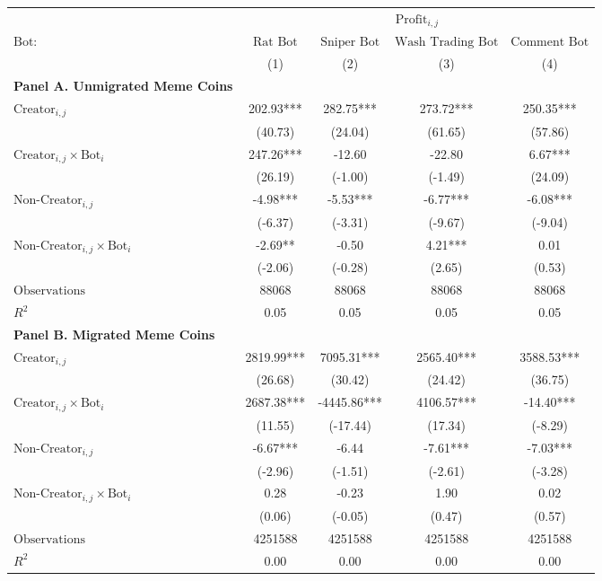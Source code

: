 \begin{tabular}{lcccc}
\toprule
 & \multicolumn{4}{c}{$\text{Profit}_{i,j}$} \\
\cline{2-5}
 $\text{Bot}:$ & $\text{Rat Bot}$ & $\text{Sniper Bot}$ & $\text{Wash Trading Bot}$ & $\text{Comment Bot}$ \\
 & (1) & (2) & (3) & (4)\\
\midrule
\textbf{Panel A. Unmigrated Meme Coins}\\
\midrule
$\text{Creator}_{i,j}$ & 202.93*** & 282.75*** & 273.72*** & 250.35*** \\
 & (40.73) & (24.04) & (61.65) & (57.86) \\
$\text{Creator}_{i,j} \times \text{Bot}_i$ & 247.26*** & -12.60 & -22.80 & 6.67*** \\
 & (26.19) & (-1.00) & (-1.49) & (24.09) \\
$\text{Non-Creator}_{i,j}$ & -4.98*** & -5.53*** & -6.77*** & -6.08*** \\
 & (-6.37) & (-3.31) & (-9.67) & (-9.04) \\
$\text{Non-Creator}_{i,j} \times \text{Bot}_i$ & -2.69** & -0.50 & 4.21*** & 0.01 \\
 & (-2.06) & (-0.28) & (2.65) & (0.53) \\
\midrule
$\text{Observations}$ & 88068 & 88068 & 88068 & 88068 \\
$R^2$ & 0.05 & 0.05 & 0.05 & 0.05 \\
\midrule
\textbf{Panel B. Migrated Meme Coins}\\
\midrule
$\text{Creator}_{i,j}$ & 2819.99*** & 7095.31*** & 2565.40*** & 3588.53*** \\
 & (26.68) & (30.42) & (24.42) & (36.75) \\
$\text{Creator}_{i,j} \times \text{Bot}_i$ & 2687.38*** & -4445.86*** & 4106.57*** & -14.40*** \\
 & (11.55) & (-17.44) & (17.34) & (-8.29) \\
$\text{Non-Creator}_{i,j}$ & -6.67*** & -6.44 & -7.61*** & -7.03*** \\
 & (-2.96) & (-1.51) & (-2.61) & (-3.28) \\
$\text{Non-Creator}_{i,j} \times \text{Bot}_i$ & 0.28 & -0.23 & 1.90 & 0.02 \\
 & (0.06) & (-0.05) & (0.47) & (0.57) \\
\midrule
$\text{Observations}$ & 4251588 & 4251588 & 4251588 & 4251588 \\
$R^2$ & 0.00 & 0.00 & 0.00 & 0.00 \\
\bottomrule
\end{tabular}
